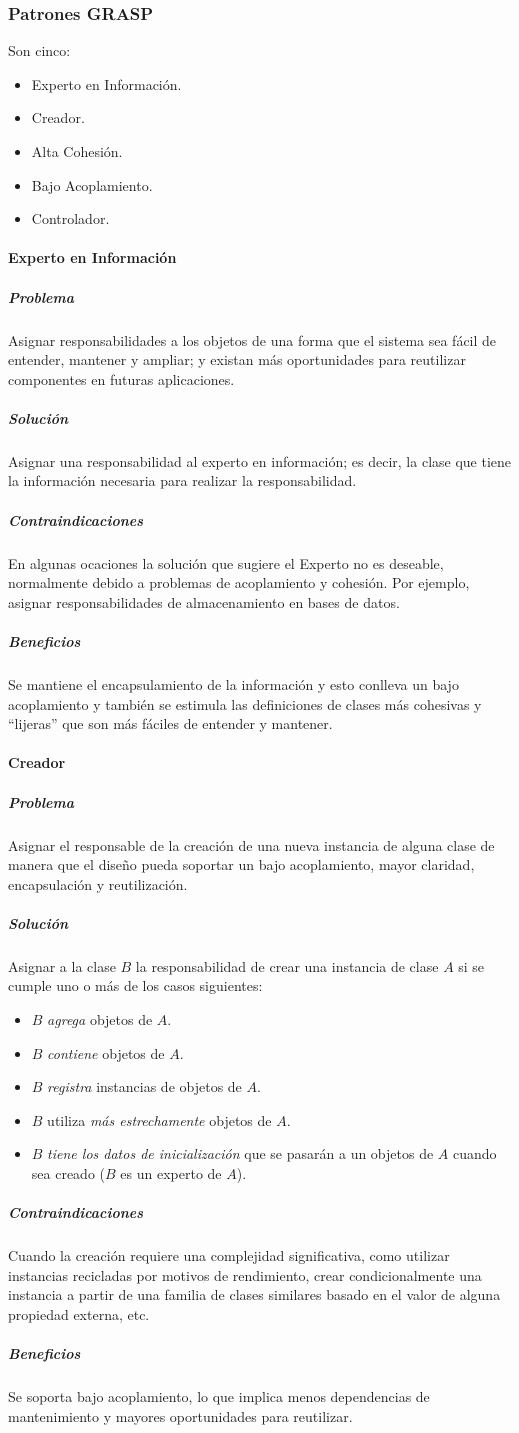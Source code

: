 \subsubsection{Patrones GRASP}
Son cinco:
\begin{itemize}
\item Experto en Información.
\item Creador.
\item Alta Cohesión.
\item Bajo Acoplamiento.
\item Controlador.
\end{itemize}
\paragraph{Experto en Información}
\subparagraph{Problema}
Asignar responsabilidades a los objetos de una forma que el sistema sea fácil de entender, mantener y ampliar; y existan más oportunidades para reutilizar componentes en futuras aplicaciones.
\subparagraph{Solución}
Asignar una responsabilidad al experto en información; es decir, la clase que tiene la información necesaria para realizar la responsabilidad.
\subparagraph{Contraindicaciones}
En algunas ocaciones la solución que sugiere el Experto no es deseable, normalmente debido a problemas de acoplamiento y cohesión. Por ejemplo, asignar responsabilidades de almacenamiento en bases de datos.
\subparagraph{Beneficios}
Se mantiene el encapsulamiento de la información y esto conlleva un bajo acoplamiento y también se estimula las definiciones de clases más cohesivas y ``lijeras'' que son más fáciles de entender y mantener.
\paragraph{Creador}
\subparagraph{Problema}
Asignar el responsable de la creación de una nueva instancia de alguna clase de manera que el diseño pueda soportar un bajo acoplamiento, mayor claridad, encapsulación y reutilización.
\subparagraph{Solución}
Asignar a la clase $B$ la responsabilidad de crear una instancia de clase $A$ si se cumple uno o más de los casos siguientes:
\begin{itemize}
\item $B$ \emph{agrega} objetos de $A$.
\item $B$ \emph{contiene} objetos de $A$.
\item $B$ \emph{registra} instancias de objetos de $A$.
\item $B$ utiliza \emph{más estrechamente} objetos de $A$.
\item $B$ \emph{tiene los datos de inicialización} que se pasarán a un objetos de $A$ cuando sea creado ($B$ es un experto de $A$).
\end{itemize}
\subparagraph{Contraindicaciones}
Cuando la creación requiere una complejidad significativa, como utilizar instancias recicladas por motivos de rendimiento, crear condicionalmente una instancia a partir de una familia de clases similares basado en el valor de alguna propiedad externa, etc.
\subparagraph{Beneficios}
Se soporta bajo acoplamiento, lo que implica menos dependencias de mantenimiento y mayores oportunidades para reutilizar.
